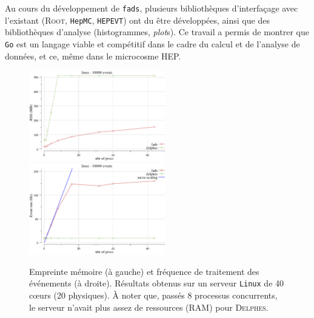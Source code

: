 \documentclass[a4paper,french]{article}
\begin{document}
Au cours du d\'eveloppement de \texttt{fads}, plusieurs biblioth\`eques
d'interfa\c cage avec l'existant (\textsc{Root}, \texttt{HepMC},
\texttt{HEPEVT}) ont du \^etre d\'evelopp\'ees, ainsi que des biblioth\`eques
d'analyse (histogrammes, \emph{plot}s).
Ce travail a permis de montrer que \texttt{Go} est un langage viable et
comp\'etitif dans le cadre du calcul et de l'analyse de donn\'ees, et ce, m\^eme
dans le microcosme HEP.

\begin{figure}[h]
	\begin{center}
	\includegraphics[width=14pc]{figs/lhcb3-rss.png}
	\includegraphics[width=14pc]{figs/lhcb3-hz.png}
	\end{center}
	\caption{\label{fig-fads-delphes}Empreinte m\'emoire (\`a gauche) et
	fr\'equence de traitement des \'ev\'enements (\`a droite). R\'esultats
	obtenus sur un serveur \texttt{Linux} de 40 c\oe urs (20 physiques).
	\`A noter que, pass\'es 8 processus concurrents, le serveur n'avait plus
	assez de ressources (RAM) pour \textsc{Delphes}.}
\end{figure}
\end{document}
